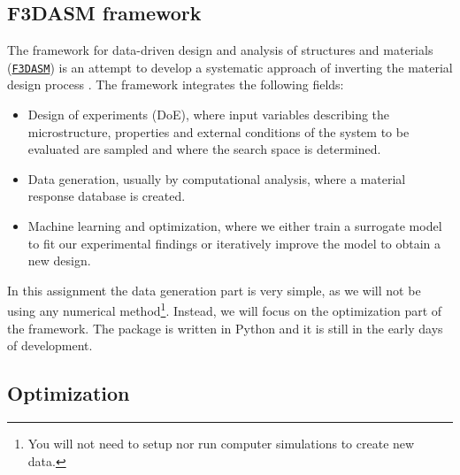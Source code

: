 \documentclass[10pt,a4paper,twoside]{article} %
\def\code#1{\texttt{#1}}
\begin{document}
\subsection*{F3DASM framework}

The framework for data-driven design and analysis of structures and materials (\href{https://github.com/bessagroup/f3dasm/tree/versionmartin}{\code{F3DASM}}) is an attempt to develop a systematic approach of inverting the material design process \cite{Bessa2017}. The framework integrates the following fields:

\begin{itemize}
	\item Design of experiments (DoE), where input variables describing the microstructure, properties and external conditions of the system to be evaluated are sampled and where the search space is determined.
	\item Data generation, usually by computational analysis, where a material response database is created.
	\item Machine learning and optimization, where we either train a surrogate model to fit our experimental findings or iteratively improve the model to obtain a new design.
\end{itemize}



In this assignment the data generation part is very simple, as we will not be using any numerical method\footnote{You will not need to setup nor run computer simulations to create new data.}. Instead, we will focus on the optimization part of the framework.
The package is written in Python and it is still in the early days of development. %


\subsection*{Optimization}
\end{document}
